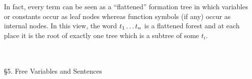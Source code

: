 \begin{enumerate}[1.]
\begin{remark}
In fact, every term can be seen as a ``flattened'' formation tree in which variables or constants occur as leaf nodes whereas function symbols (if any) occur as internal nodes. In this view, the word $t_1 \ldots t_n$ is a flattened forest and at each place it is the root of exactly one tree which is a subtree of some $t_i$.
\end{remark}
\end{enumerate}
\ 
\\
\\
{\large \S5. Free Variables and Sentences}
